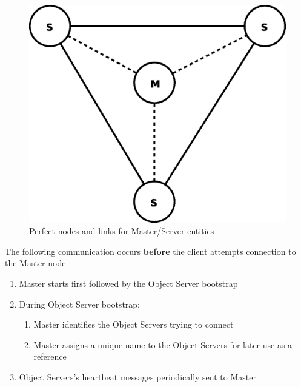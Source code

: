 \documentclass[times, 10pt,twocolumn]{article}
\begin{document}
\begin{figure}
\centering
\includegraphics[scale=0.3]{perfect.eps}
\caption{Perfect nodes and links for Master/Server entities}
\label{fig:perf}
\end{figure}

\label{subsec:recov}

\label{sec:algor}

The following communication occurs {\bf before} the client attempts connection 
to the Master node.
\begin{enumerate}
\item Master starts first followed by the Object Server bootstrap
\item During Object Server bootstrap:
\begin{enumerate}
\item Master identifies the Object Servers trying to connect
\item Master assigns a unique name to the Object Servers for later use as a reference
\end{enumerate}
\item Object Servers's heartbeat messages periodically sent to Master
\end{enumerate}
\end{document}
